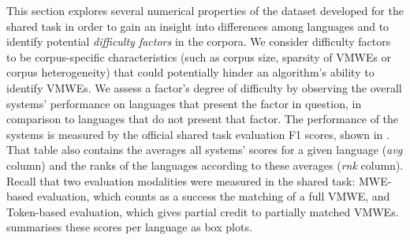 \documentclass[output=paper
,modfonts
,nonflat,draftmode]{langsci/langscibook}
\begin{document}
This section explores several numerical properties of the dataset developed for the shared task in order to gain an insight into differences among languages and to identify potential \emph{difficulty factors} in the corpora. We consider difficulty factors to be corpus-specific characteristics (such as corpus size, sparsity of VMWEs or corpus heterogeneity) that could potentially hinder an algorithm's ability to identify VMWEs. We assess a factor's degree of difficulty by observing the overall systems' performance on languages that present the factor in question, in comparison to languages that do not present that factor. The performance of the systems is measured by the official shared task evaluation F1 scores, shown in . That table also contains the averages all systems' scores for a given language (\emph{avg} column) and the ranks of the languages according to these averages (\emph{rnk} column). Recall that two evaluation modalities were measured in the shared task: MWE-based evaluation, which counts as a success the matching of a full VMWE, and Token-based evaluation, which gives partial credit to partially matched VMWEs.  summarises these scores per language as box plots. 
\end{document}
